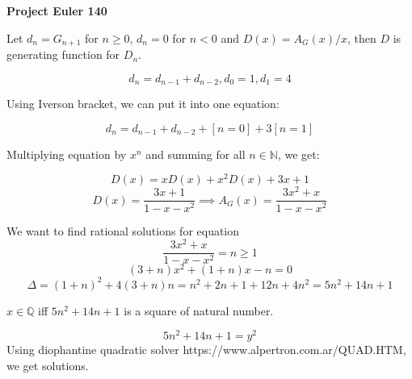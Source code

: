 \documentclass[a4paper,12pt]{article}
\begin{document}
\setlength\parindent{0pt}
\textbf{Project Euler 140}
\vspace{5ex}

Let \(d_n = G_{n + 1}\) for \(n \geq 0\), \(d_n = 0\) for \(n < 0\) and \(D(x) = A_G(x) / x\), then \(D\) is generating function for \(D_n\).

\[d_n = d_{n - 1} + d_{n - 2}, d_0 = 1, d_1 = 4\]

Using Iverson bracket, we can put it into one equation:

\[d_n = d_{n - 1} + d_{n - 2} + [n = 0] + 3[n = 1]\]

Multiplying equation by \(x^n\) and summing for all \(n \in \mathbb{N}\), we get:

\[D(x) = xD(x) + x^2D(x) + 3x + 1\]
\[D(x) = \frac{3x + 1}{1 - x - x^2} \implies A_G(x) = \frac{3x^2+x}{1-x-x^2}\]

We want to find rational solutions for equation
\[\frac{3x^2+x}{1-x-x^2} = n \geq 1\]
\[(3+n)x^2 + (1 + n)x - n = 0\]
\[\Delta = (1 + n)^2 + 4(3+n)n = n^2 + 2n + 1 + 12n + 4n^2 = 5n^2 + 14n + 1\]

\(x \in \mathbb{Q}\) iff \(5n^2 + 14n + 1\) is a square of natural number.

\[5n^2 + 14n + 1 = y^2\]
Using diophantine quadratic solver https://www.alpertron.com.ar/QUAD.HTM, we get solutions.
\end{document}
